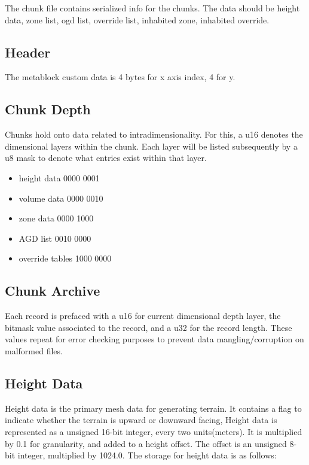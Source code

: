 The chunk file contains serialized info for the chunks. The data should be height data, zone list, ogd list, override list, inhabited zone, inhabited override.

\subsection{Header}
The metablock custom data is 4 bytes for x axis index, 4 for y.

\subsection{Chunk Depth}
    Chunks hold onto data related to intradimensionality. For this, a u16 denotes the dimensional layers within the chunk. Each layer will be listed subsequently by a u8 mask to denote what entries exist within that layer.
    
    \begin{itemize}
        \item height data     0000 0001
        \item volume data     0000 0010
        \item zone data       0000 1000
        \item AGD list        0010 0000
        \item override tables 1000 0000
    \end{itemize}

\subsection{Chunk Archive}

    Each record is prefaced with a u16 for current dimensional depth layer, the bitmask value associated to the record, and a u32 for the record length. These values repeat for error checking purposes to prevent data mangling/corruption on malformed files.

\subsection{Height Data}
    Height data is the primary mesh data for generating terrain. It contains a flag to indicate whether the terrain is upward or downward facing,
    Height data is represented as a unsigned 16-bit integer, every two units(meters). It is multiplied by 0.1 for granularity, and added to a height offset. The offset is an unsigned 8-bit integer, multiplied by 1024.0. The storage for height data is as follows:

